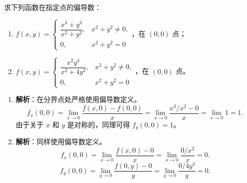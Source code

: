 \documentclass[lang=cn,11pt]{elegantbook}
\begin{document}
\begin{exercise}[分段函数在指定点的偏导数]
求下列函数在指定点的偏导数：
\begin{enumerate}
  \item[(1)] $f(x,y) = \begin{cases} \dfrac{x^3+y^3}{x^2+y^2}, & x^2+y^2 \neq 0, \\ 0, & x^2+y^2 = 0 \end{cases}$，在 $(0,0)$ 点；
  \item[(2)] $f(x,y) = \begin{cases} \dfrac{x^2y^3}{x^2+4y^3}, & x^2+y^2 \neq 0, \\ 0, & x^2+y^2 = 0 \end{cases}$，在 $(0,0)$ 点。
\end{enumerate}
\end{exercise}
\begin{solution}
\begin{enumerate}
  \item[(1)] \textbf{解析}：在分界点处严格使用偏导数定义。
  \[
  f_x(0,0) = \lim_{x \to 0} \frac{f(x,0) - f(0,0)}{x} = \lim_{x \to 0} \frac{x^3/x^2 - 0}{x} = \lim_{x \to 0} 1 = 1.
  \]
  由于关于 $x$ 和 $y$ 是对称的，同理可得 $f_y(0,0) = 1$。
  
  \item[(2)] \textbf{解析}：同样使用偏导数定义。
  \[
  f_x(0,0) = \lim_{x \to 0} \frac{f(x,0) - 0}{x} = \lim_{x \to 0} \frac{0/x^2}{x} = 0.
  \]
  \[
  f_y(0,0) = \lim_{y \to 0} \frac{f(0,y) - 0}{y} = \lim_{y \to 0} \frac{0/4y^3}{y} = 0.
  \]
\end{enumerate}
\end{solution}
\end{document}
